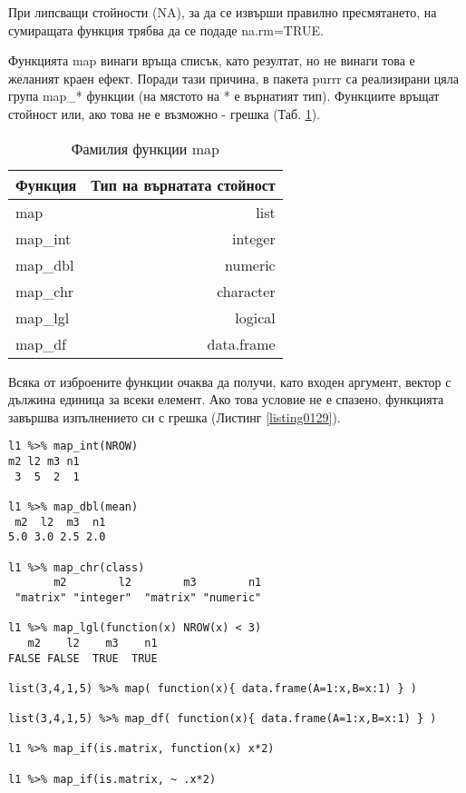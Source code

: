При липсващи стойности (NA), за да се извърши правилно пресмятането, на сумиращата функция трябва да се подаде na.rm=TRUE.

Функцията map винаги връща списък, като резултат, но не винаги това е желаният краен ефект. Поради тази причина, в пакета purrr са реализирани цяла група map\_* функции (на мястото на * е върнатият тип). Функциите връщат стойност или, ако това не е възможно - грешка (Таб. \ref{table0004}). 

\begin{table}[h!]
\centering
\begin{tabular}{|l|r|} 
  \rowcolor{lightgray}
  \hline
  Функция & Тип на върнатата стойност \\ [0.1ex] 
  \hline\hline
  map & list \\
  \hline
  map\_int & integer \\
  \hline
  map\_dbl & numeric \\
  \hline
  map\_chr & character \\
  \hline
  map\_lgl & logical \\
  \hline
  map\_df & data.frame \\
  \hline
\end{tabular}
\caption{Фамилия функции map}
\label{table0004}
\end{table}

Всяка от изброените функции очаква да получи, като входен аргумент, вектор с дължина единица за всеки елемент. Ако това условие не е спазено, функцията завършва  изпълнението си  с грешка (Листинг \ref{listing0129}). 

\begin{lstlisting}[caption=Извиквания на map\, според типа на върнатата стойност, label=listing0129]
l1 %>% map_int(NROW)
m2 l2 m3 n1 
 3  5  2  1 
 
l1 %>% map_dbl(mean)
 m2  l2  m3  n1 
5.0 3.0 2.5 2.0 

l1 %>% map_chr(class)
       m2        l2        m3        n1 
 "matrix" "integer"  "matrix" "numeric" 

l1 %>% map_lgl(function(x) NROW(x) < 3)
   m2    l2    m3    n1 
FALSE FALSE  TRUE  TRUE 

list(3,4,1,5) %>% map( function(x){ data.frame(A=1:x,B=x:1) } )

list(3,4,1,5) %>% map_df( function(x){ data.frame(A=1:x,B=x:1) } )

l1 %>% map_if(is.matrix, function(x) x*2)

l1 %>% map_if(is.matrix, ~ .x*2)
\end{lstlisting}

